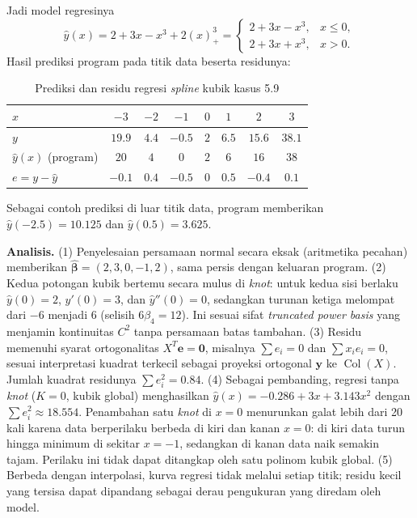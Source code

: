 \documentclass[12pt,a4paper]{article}
\begin{document}
Jadi model regresinya
\[
  \hat y(x)=2+3x-x^3+2(x)_+^3=
  \begin{cases}2+3x-x^3, & x\le0,\\ 2+3x+x^3, & x>0.\end{cases}
\]
Hasil prediksi program pada titik data beserta residunya:
\begin{table}[H]
\centering\small
\begin{tabular}{@{}lccccccc@{}}
\toprule
$x$ & $-3$ & $-2$ & $-1$ & $0$ & $1$ & $2$ & $3$\\
\midrule
$y$ & $19.9$ & $4.4$ & $-0.5$ & $2$ & $6.5$ & $15.6$ & $38.1$\\
$\hat y(x)$ (program) & $20$ & $4$ & $0$ & $2$ & $6$ & $16$ & $38$\\
$e=y-\hat y$ & $-0.1$ & $0.4$ & $-0.5$ & $0$ & $0.5$ & $-0.4$ & $0.1$\\
\bottomrule
\end{tabular}
\caption{Prediksi dan residu regresi \textit{spline} kubik kasus 5.9}
\end{table}
Sebagai contoh prediksi di luar titik data, program memberikan $\hat y(-2.5)=10.125$ dan $\hat y(0.5)=3.625$.

\textbf{Analisis.} (1) Penyelesaian persamaan normal secara eksak (aritmetika pecahan) memberikan $\hat{\boldsymbol\beta}=(2,3,0,-1,2)$, sama persis dengan keluaran program. (2) Kedua potongan kubik bertemu secara mulus di \textit{knot}: untuk kedua sisi berlaku $\hat y(0)=2$, $\hat y'(0)=3$, dan $\hat y''(0)=0$, sedangkan turunan ketiga melompat dari $-6$ menjadi $6$ (selisih $6\beta_4=12$). Ini sesuai sifat \textit{truncated power basis} yang menjamin kontinuitas $C^2$ tanpa persamaan batas tambahan. (3) Residu memenuhi syarat ortogonalitas $X^T\mathbf{e}=\mathbf{0}$, misalnya $\sum e_i=0$ dan $\sum x_ie_i=0$, sesuai interpretasi kuadrat terkecil sebagai proyeksi ortogonal $\mathbf{y}$ ke $\operatorname{Col}(X)$. Jumlah kuadrat residunya $\sum e_i^2=0.84$. (4) Sebagai pembanding, regresi tanpa \textit{knot} ($K=0$, kubik global) menghasilkan $\hat y(x)=-0.286+3x+3.143x^2$ dengan $\sum e_i^2\approx18.554$. Penambahan satu \textit{knot} di $x=0$ menurunkan galat lebih dari 20 kali karena data berperilaku berbeda di kiri dan kanan $x=0$: di kiri data turun hingga minimum di sekitar $x=-1$, sedangkan di kanan data naik semakin tajam. Perilaku ini tidak dapat ditangkap oleh satu polinom kubik global. (5) Berbeda dengan interpolasi, kurva regresi tidak melalui setiap titik; residu kecil yang tersisa dapat dipandang sebagai derau pengukuran yang diredam oleh model.
\end{document}
